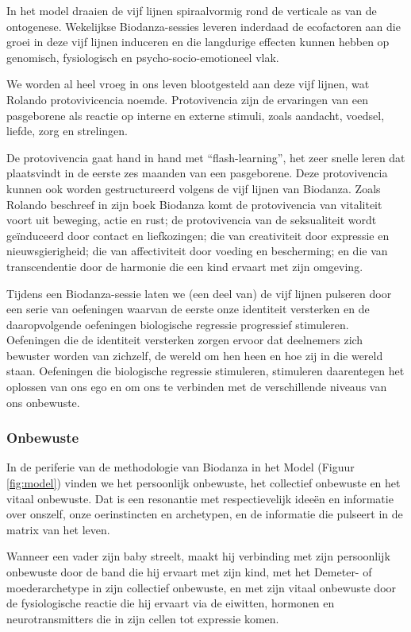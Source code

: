 \documentclass[
  11pt,
]{book}
\begin{document}
In het model draaien de vijf lijnen spiraalvormig rond de verticale as van de ontogenese. Wekelijkse Biodanza-sessies leveren inderdaad de ecofactoren aan die groei in deze vijf lijnen induceren en die langdurige effecten kunnen hebben op genomisch, fysiologisch en psycho-socio-emotioneel vlak.

We worden al heel vroeg in ons leven blootgesteld aan deze vijf lijnen, wat Rolando protovivicencia noemde. Protovivencia zijn de ervaringen van een pasgeborene als reactie op interne en externe stimuli, zoals aandacht, voedsel, liefde, zorg en strelingen.

De protovivencia gaat hand in hand met ``flash-learning'', het zeer snelle leren dat plaatsvindt in de eerste zes maanden van een pasgeborene. Deze protovivencia kunnen ook worden gestructureerd volgens de vijf lijnen van Biodanza. Zoals Rolando beschreef in zijn boek Biodanza \citep{toro2008} komt de protovivencia van vitaliteit voort uit beweging, actie en rust; de protovivencia van de seksualiteit wordt geïnduceerd door contact en liefkozingen; die van creativiteit door expressie en nieuwsgierigheid; die van affectiviteit door voeding en bescherming; en die van transcendentie door de harmonie die een kind ervaart met zijn omgeving.

Tijdens een Biodanza-sessie laten we (een deel van) de vijf lijnen pulseren door een serie van oefeningen waarvan de eerste onze identiteit versterken en de daaropvolgende oefeningen biologische regressie progressief stimuleren. Oefeningen die de identiteit versterken zorgen ervoor dat deelnemers zich bewuster worden van zichzelf, de wereld om hen heen en hoe zij in die wereld staan. Oefeningen die biologische regressie stimuleren, stimuleren daarentegen het oplossen van ons ego en om ons te verbinden met de verschillende niveaus van ons onbewuste.

\hypertarget{onbewuste}{%
\subsubsection{Onbewuste}\label{onbewuste}}

In de periferie van de methodologie van Biodanza in het Model (Figuur \ref{fig:model}) vinden we het persoonlijk onbewuste, het collectief onbewuste en het vitaal onbewuste. Dat is een resonantie met respectievelijk ideeën en informatie over onszelf, onze oerinstincten en archetypen, en de informatie die pulseert in de matrix van het leven.

Wanneer een vader zijn baby streelt, maakt hij verbinding met zijn persoonlijk onbewuste door de band die hij ervaart met zijn kind, met het Demeter- of moederarchetype in zijn collectief onbewuste, en met zijn vitaal onbewuste door de fysiologische reactie die hij ervaart via de eiwitten, hormonen en neurotransmitters die in zijn cellen tot expressie komen.
\end{document}
